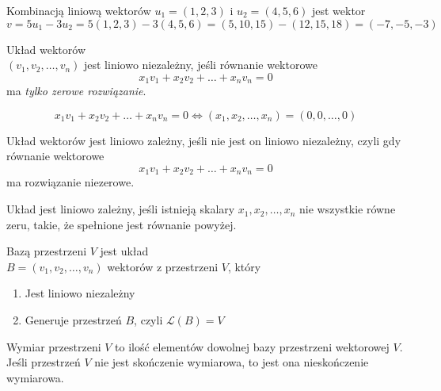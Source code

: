 \documentclass[a4paper,12pt]{article}
\begin{document}
\begin{example}
	Kombinacją liniową wektorów $u_1 = (1,2,3)$ i $u_2 = (4,5,6)$ jest wektor
	\[
		v = 5u_1 - 3u_2 = 5(1,2,3) - 3(4,5,6) = (5,10,15) - (12,15,18) = (-7,-5,-3)
	\]
\end{example}

\newpage

\begin{definition}
	Układ wektorów \\ $(v_1,v_2, \dots, v_n)$ jest liniowo niezależny, jeśli równanie wektorowe
	\[
		x_1 v_1 + x_2 v_2 + \dots + x_n v_n = 0
 	\] 
	ma \emph{tylko zerowe rozwiązanie}.
\end{definition}

\begin{intuitive}
	\[
		x_1 v_1 + x_2 v_2 + \dots + x_n v_n = 0 \iff (x_1, x_2, \dots, x_n) = (0,0,\dots,0)
	\]
\end{intuitive}

\begin{definition}
	Układ wektorów jest liniowo zależny, jeśli nie jest on liniowo niezależny, czyli gdy równanie wektorowe
	\[
		x_1 v_1 + x_2 v_2 + \dots + x_n v_n = 0
	\]
	ma rozwiązanie niezerowe.
\end{definition}

\begin{intuitive}
	Układ jest liniowo zależny, jeśli istnieją skalary $x_1, x_2, \dots, x_n$ nie wszystkie równe zeru, takie, że spełnione jest równanie powyżej.
\end{intuitive}

\begin{definition}
	Bazą przestrzeni $V$ jest układ  \\ $B = (v_1, v_2, \dots, v_n)$ wektorów z przestrzeni $V$, który
	\begin{enumerate}
		\item Jest liniowo niezależny
		\item Generuje przestrzeń $B$, czyli $\mathcal{L}(B) = V$ 
	\end{enumerate}
\end{definition}

\begin{definition}
	Wymiar przestrzeni $V$ to ilość elementów dowolnej bazy przestrzeni wektorowej $V$. Jeśli przestrzeń $V$ nie jest skończenie wymiarowa, to jest ona nieskończenie wymiarowa. 
\end{definition}
\end{document}
